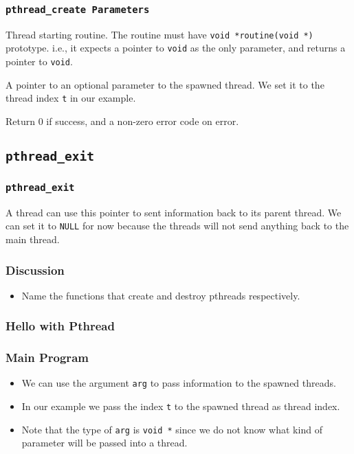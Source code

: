 \documentclass{beamer}
\begin{document}
\begin{frame}
\frametitle{\tt pthread\_create Parameters}
\begin{description}[l]
\item[\tt start\_routinue] Thread starting routine.  The routine must
  have {\tt void *routine(void *)} prototype. i.e., it expects a
  pointer to {\tt void} as the only parameter, and returns a pointer
  to {\tt void}.
\item[\tt arg] A pointer to an optional parameter to the spawned
  thread.  We set it to the thread index {\tt t} in our example.
\item[\tt return value] Return 0 if success, and a non-zero error code
  on error.
\end{description}
\end{frame}

\subsection{\tt pthread\_exit}

\begin{frame}
\frametitle{\tt pthread\_exit}
\begin{description}[l]
\item[\tt value] A thread can use this pointer to sent information
  back to its parent thread.  We can set it to {\tt NULL} for now
  because the threads will not send anything back to the main thread.
\end{description}
\end{frame}

\begin{frame}
\frametitle{Discussion}
\begin{itemize}
\item Name the functions that create and destroy pthreads respectively.
\end{itemize}
\end{frame}

\begin{frame}
\frametitle{Hello with Pthread}
\end{frame}

\begin{frame}
\frametitle{Main Program}
\begin{itemize}
\item We can use the argument {\tt arg} to pass information to the
  spawned threads.
\item In our example we pass the index {\tt t} to the spawned thread
  as thread index.
\item Note that the type of {\tt arg} is {\tt void *} since we do not
  know what kind of parameter will be passed into a thread.
\end{itemize}
\end{frame}
\end{document}
